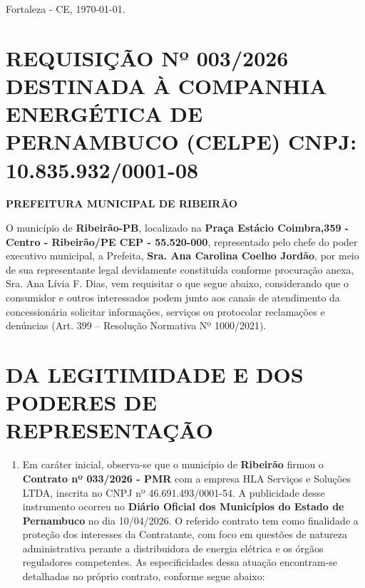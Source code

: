 \documentclass[11pt,a4paper]{article}
\begin{document}
\begin{flushright}
Fortaleza - CE, \today.
\end{flushright}

\section{REQUISIÇÃO Nº 003/2026 DESTINADA À COMPANHIA ENERGÉTICA DE PERNAMBUCO (CELPE) CNPJ: 10.835.932/0001-08}
\vspace{-0.4cm}
\textbf{PREFEITURA MUNICIPAL DE RIBEIRÃO}

\vspace{0.5cm}

O município de \textbf{Ribeirão-PB}, localizado na \textbf{Praça Estácio Coimbra,359 - Centro - Ribeirão/PE CEP - 55.520-000}, representado pelo chefe do poder executivo municipal, a Prefeita, \textbf{Sra. Ana Carolina Coelho Jordão}, por meio de sua representante legal devidamente constituída conforme procuração anexa, Sra. Ana Lívia F. Dias, vem requisitar o que segue abaixo, considerando que o consumidor e outros interessados podem junto aos canais de atendimento da concessionária solicitar informações, serviços ou protocolar reclamações e denúncias (Art. 399 -- Resolução Normativa Nº 1000/2021).

\section{DA LEGITIMIDADE E DOS PODERES DE REPRESENTAÇÃO}

\begin{enumerate}
\item
  Em caráter inicial, observa-se que o município de \textbf{Ribeirão} firmou o \textbf{Contrato nº 033/2026 - PMR} com a empresa HLA Serviços e Soluções LTDA, inscrita no CNPJ nº 46.691.493/0001-54. A publicidade desse instrumento ocorreu no \textbf{Diário Oficial dos Municípios do Estado de Pernambuco} no dia 10/04/2026. O referido contrato tem como finalidade a proteção dos interesses da Contratante, com foco em questões de natureza administrativa perante a distribuidora de energia elétrica e os órgãos reguladores competentes. As especificidades dessa atuação encontram-se detalhadas no próprio contrato, conforme segue abaixo:
\end{enumerate}
\end{document}
